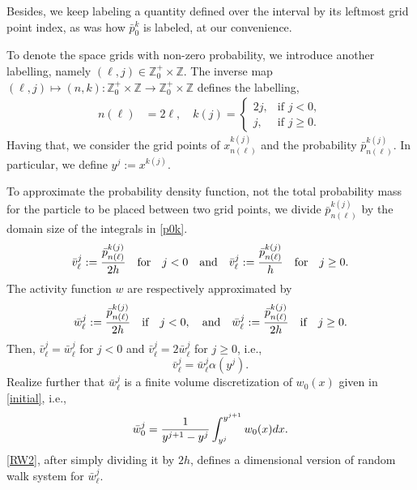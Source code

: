 \documentclass[a4paper,11pt]{article}
\theoremstyle{remark}
\begin{document}
Besides, we keep labeling a quantity defined over the interval by its leftmost grid point index, as was how $\bar{p}^k_0$ is labeled, at our convenience.


To denote the space grids with non-zero probability, we introduce another labelling, namely $(\ell,j)\in \mathbb{Z}_0^+ \times \mathbb{Z}$. The inverse map $(\ell,j)\mapsto (n,k): \mathbb{Z}_0^+ \times \mathbb{Z} \rightarrow \mathbb{Z}_0^+ \times \mathbb{Z}$ defines the labelling,
\begin{align*}
 n(\ell) &= 2\ell, \quad 
 k(j)  =\left\{\begin{array}{lr}
        2j, & \text{if } j<0,\\
        j, & \text{if }  j\ge0.
        \end{array}\right.
\end{align*}
Having that, we consider the grid points of $x^{k(j)}_{n(\ell)}$ and the probability $\bar{p}_{n(\ell)}^{k(j)}$. In particular, we define $y^j:=x^{k(j)}$.

To approximate the probability density function, not the total probability mass for the particle to be placed between two grid points, we divide $\bar{p}_{n(\ell)}^{k(j)}$ by the domain size of the integrals in \eqref{p0k}. 
\begin{equation}\label{vj}
\bar{v}^{j}_\ell:={\bar{p}_{n(\ell)}^{k(j)} \over2h}\quad\text{for}\quad
j<0\quad\text{and}
\quad \bar{v}^{j}_\ell:={\bar{p}_{n(\ell)}^{k(j)}\over h}\quad\text{for}\quad j\ge0.
\end{equation}
The activity function $w$ are respectively approximated by
\begin{equation}\label{pandw}
\bar{w}^{j}_\ell:={\bar{p}_{n(\ell)}^{k(j)}\over2h}\quad\text{if}\quad j<0,\quad\text
{and} \quad \bar{w}^{j}_\ell:={\bar{p}_{n(\ell)}^{k(j)} \over2h}\quad\text{if}\quad j\ge0.
\end{equation}
Then, $\bar{v}^{j}_\ell=\bar{w}^{j}_\ell$ for $j<0$ and $\bar{v}^{j}_\ell=2\bar{w}^{j}_\ell$ for
$j\ge0$, i.e.,
$$
\bar{v}^j_\ell=\bar{w}_\ell^j\alpha(y^j).
$$
Realize further that $\bar{w}^{j}_\ell$ is a finite volume discretization of $w_0(x)$ given in \eqref{initial}, i.e.,
\begin{equation} \label{vol_aver+pmf}
\bar{w}_{0}^{j} ={1\over y^{j+1}-y^{j}}\int_{y^j}^{y^{j+1}} w_0(x)dx.
\end{equation}
\eqref{RW2}, after simply dividing it by $2h$, defines a dimensional version of random walk system for $\bar{w}^{j}_\ell$. 
\end{document}
